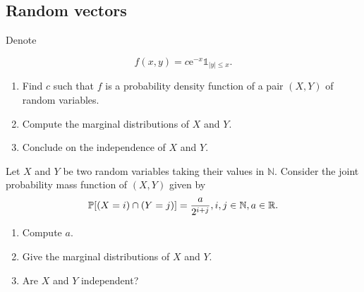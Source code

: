 \begin{center}
  \section*{Random vectors}
\end{center}

\begin{Exercise}
  Denote

  \[
    f(x, y)=c \mathrm{e}^{-x} \mathbb{1}_{|y| \leq x} .
  \]

  \begin{enumerate}
    \item Find $c$ such that $f$ is a probability density function of a pair $(X, Y)$ of
          random variables.

    \item Compute the marginal distributions of $X$ and $Y$.

    \item Conclude on the independence of $X$ and $Y$.

  \end{enumerate}

\end{Exercise}

\begin{Exercise}
  Let $X$ and $Y$ be two random variables taking their values in $\mathbb{N}$. Consider the joint probability mass function of $(X, Y)$ given by
  \[
    \mathbb{P}[(X = i) \cap (Y = j)] = \frac{a}{2^{i+j}}, i, j \in \mathbb{N}, a \in \mathbb{R} .
  \]
  \begin{enumerate}
    \item Compute $a$.
    \item Give the marginal distributions of $X$ and $Y$.
    \item Are $X$ and $Y$ independent?
  \end{enumerate}
\end{Exercise}

